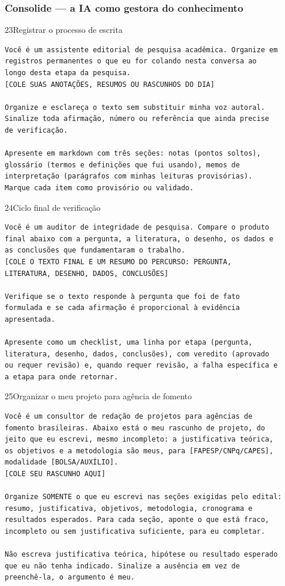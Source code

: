 \documentclass[11pt,a4paper]{article}
\begin{document}
\subsubsection*{Consolide --- a IA como gestora do conhecimento}

\begin{modelo}{23}{Registrar o processo de escrita}
\begin{lstlisting}
Você é um assistente editorial de pesquisa acadêmica. Organize em
registros permanentes o que eu for colando nesta conversa ao
longo desta etapa da pesquisa.
[COLE SUAS ANOTAÇÕES, RESUMOS OU RASCUNHOS DO DIA]

Organize e esclareça o texto sem substituir minha voz autoral.
Sinalize toda afirmação, número ou referência que ainda precise
de verificação.

Apresente em markdown com três seções: notas (pontos soltos),
glossário (termos e definições que fui usando), memos de
interpretação (parágrafos com minhas leituras provisórias).
Marque cada item como provisório ou validado.
\end{lstlisting}
\end{modelo}

\begin{modelo}{24}{Ciclo final de verificação}
\begin{lstlisting}
Você é um auditor de integridade de pesquisa. Compare o produto
final abaixo com a pergunta, a literatura, o desenho, os dados e
as conclusões que fundamentaram o trabalho.
[COLE O TEXTO FINAL E UM RESUMO DO PERCURSO: PERGUNTA,
LITERATURA, DESENHO, DADOS, CONCLUSÕES]

Verifique se o texto responde à pergunta que foi de fato
formulada e se cada afirmação é proporcional à evidência
apresentada.

Apresente como um checklist, uma linha por etapa (pergunta,
literatura, desenho, dados, conclusões), com veredito (aprovado
ou requer revisão) e, quando requer revisão, a falha específica e
a etapa para onde retornar.
\end{lstlisting}
\end{modelo}

\begin{modelo}{25}{Organizar o meu projeto para agência de fomento}
\begin{lstlisting}
Você é um consultor de redação de projetos para agências de
fomento brasileiras. Abaixo está o meu rascunho de projeto, do
jeito que eu escrevi, mesmo incompleto: a justificativa teórica,
os objetivos e a metodologia são meus, para [FAPESP/CNPq/CAPES],
modalidade [BOLSA/AUXÍLIO].
[COLE SEU RASCUNHO AQUI]

Organize SOMENTE o que eu escrevi nas seções exigidas pelo edital:
resumo, justificativa, objetivos, metodologia, cronograma e
resultados esperados. Para cada seção, aponte o que está fraco,
incompleto ou sem justificativa suficiente, para eu completar.

Não escreva justificativa teórica, hipótese ou resultado esperado
que eu não tenha indicado. Sinalize a ausência em vez de
preenchê-la, o argumento é meu.
\end{lstlisting}
\end{modelo}
\end{document}
